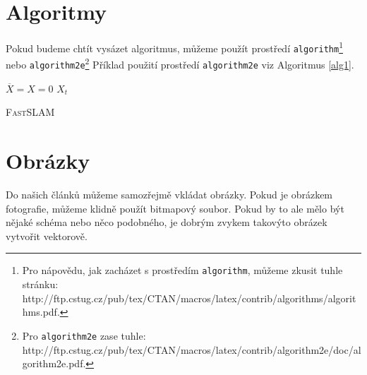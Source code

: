 \documentclass[11pt,a4paper,onecolumn]{article}
\begin{document}
\section{Algoritmy}
\label{algo}
\noindent Pokud budeme chtít vysázet algoritmus, můžeme použít prostředí \texttt{algorithm}\footnote{\raggedright Pro nápovědu, jak zacházet s prostředím \texttt{algorithm}, můžeme zkusit tuhle stránku: http://ftp.cstug.cz/pub/tex/CTAN/macros/latex/contrib/algorithms/algorithms.pdf.}
nebo \texttt{algorithm2e}\footnote{\raggedright Pro \texttt{algorithm2e} zase tuhle: http://ftp.cstug.cz/pub/tex/CTAN/macros/latex/contrib/algorithm2e/doc/algorithm2e.pdf.}
Příklad použití prostředí \texttt{algorithm2e} viz Algoritmus \ref{alg1}.

\vspace{1.5em}
\IncMargin{1em}
\begin{algorithm}[H]
\label{alg1}
\DontPrintSemicolon
\SetNlSty{}{}{:}
$\overline{X} = X = 0$ \;
\KwRet $X_t$\;
\caption{\textsc{FastSLAM}}
\end{algorithm}

\DecMargin{1em}
\vspace{1.5em}


\section{Obrázky}
\label{obr}
\noindent Do našich článků můžeme samozřejmě vkládat obrázky. Pokud je obrázkem fotografie, můžeme klidně použít bitmapový soubor. Pokud by to ale mělo být nějaké schéma nebo něco podobného, je dobrým zvykem takovýto obrázek vytvořit vektorově.
\end{document}
